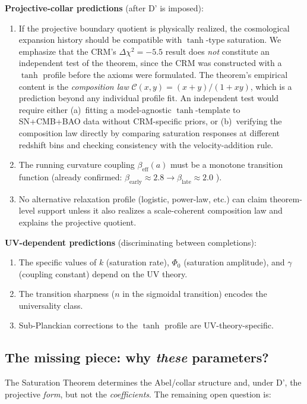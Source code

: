 \documentclass[aps,prd,twocolumn,superscriptaddress,nofootinbib]{revtex4-2}
\begin{document}
\textbf{Projective-collar predictions} (after D' is imposed):
\begin{enumerate}
\item If the projective boundary quotient is physically realized, the cosmological expansion history should be compatible with $\tanh$-type saturation. We emphasize that the CRM's $\Delta\chi^2 = -5.5$ result \cite{Geiger2026b} does \textit{not} constitute an independent test of the theorem, since the CRM was constructed with a $\tanh$ profile before the axioms were formulated. The theorem's empirical content is the \textit{composition law} $\mathcal{C}(x,y) = (x+y)/(1+xy)$, which is a prediction beyond any individual profile fit. An independent test would require either (a)~fitting a model-agnostic $\tanh$-template to SN+CMB+BAO data without CRM-specific priors, or (b)~verifying the composition law directly by comparing saturation responses at different redshift bins and checking consistency with the velocity-addition rule.
\item The running curvature coupling $\beta_{\mathrm{eff}}(a)$ must be a monotone transition function (already confirmed: $\beta_{\mathrm{early}} \approx 2.8 \to \beta_{\mathrm{late}} \approx 2.0$ \cite{Geiger2026b}).
\item No alternative relaxation profile (logistic, power-law, etc.) can claim theorem-level support unless it also realizes a scale-coherent composition law and explains the projective quotient.
\end{enumerate}

\textbf{UV-dependent predictions} (discriminating between completions):
\begin{enumerate}
\item The specific values of $k$ (saturation rate), $\Phi_0$ (saturation amplitude), and $\gamma$ (coupling constant) depend on the UV theory.
\item The transition sharpness ($n$ in the sigmoidal transition) encodes the universality class.
\item Sub-Planckian corrections to the $\tanh$ profile are UV-theory-specific.
\end{enumerate}

\subsection{The missing piece: why \textit{these} parameters?}

The Saturation Theorem determines the Abel/collar structure and, under D', the projective \textit{form}, but not the \textit{coefficients}. The remaining open question is:
\end{document}
